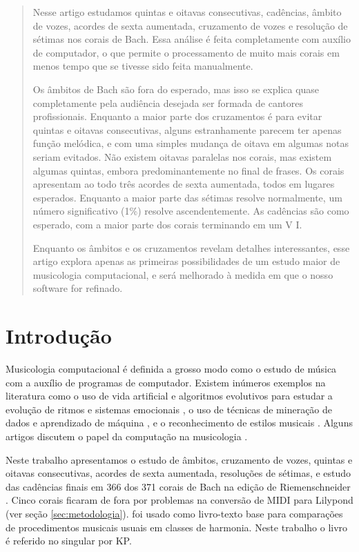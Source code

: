 \begin{abstract}
  Nesse artigo estudamos quintas e oitavas consecutivas, cadências,
  âmbito de vozes, acordes de sexta aumentada, cruzamento de vozes e
  resolução de sétimas nos corais de Bach. Essa análise é feita
  completamente com auxílio de computador, o que permite o
  processamento de muito mais corais em menos tempo que se tivesse
  sido feita manualmente.

  Os âmbitos de Bach são fora do esperado, mas isso se explica quase
  completamente pela audiência desejada ser formada de cantores
  profissionais. Enquanto a maior parte dos cruzamentos é para evitar
  quintas e oitavas consecutivas, alguns estranhamente parecem ter
  apenas função melódica, e com uma simples mudança de oitava em
  algumas notas seriam evitados. Não existem oitavas paralelas nos
  corais, mas existem algumas quintas, embora predominantemente no
  final de frases. Os corais apresentam ao todo três acordes de sexta
  aumentada, todos em lugares esperados. Enquanto a maior parte das
  sétimas resolve normalmente, um número significativo (1\%) resolve
  ascendentemente. As cadências são como esperado, com a maior parte
  dos corais terminando em um V I.

  Enquanto os âmbitos e os cruzamentos revelam detalhes interessantes,
  esse artigo explora apenas as primeiras possibilidades de um estudo
  maior de musicologia computacional, e será melhorado à medida em que
  o nosso software for refinado.

\end{abstract}

\section{Introdução}
\label{sec:introducao}

Musicologia computacional é definida a grosso modo como o estudo de
música com a auxílio de programas de computador. Existem inúmeros
exemplos na literatura como o uso de vida artificial e algoritmos
evolutivos para estudar a evolução de ritmos e sistemas emocionais
\cite{coutinho05:conputational}, o uso de técnicas de mineração de
dados e aprendizado de máquina \cite{hartmann07:interactive}, e o
reconhecimento de estilos musicais . Alguns
artigos discutem o papel da computação na musicologia
\cite{kugel92:beyond,honing04:comeback,cook05:towards}.

Neste trabalho apresentamos o estudo de âmbitos, cruzamento de vozes,
quintas e oitavas consecutivas, acordes de sexta aumentada, resoluções
de sétimas, e estudo das cadências finais em 366 dos 371 corais de
Bach na edição de Riemenschneider \cite{bach41:371}. Cinco corais
ficaram de fora por problemas na conversão de MIDI para Lilypond (ver
seção \ref{sec:metodologia}). \cite{kostka.ea00:tonal} foi usado como
livro-texto base para comparações de procedimentos musicais usuais em
classes de harmonia. Neste trabalho o livro é referido no singular por
KP.

